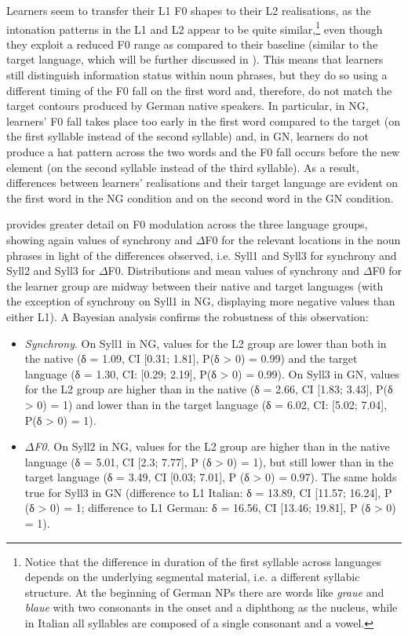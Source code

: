 Learners seem to transfer their L1 F0 shapes to their L2 realisations, as the intonation patterns in the L1 and L2 appear to be quite similar,\footnote{Notice that the difference in duration of the first syllable across languages depends on the underlying segmental material, i.e. a different syllabic structure. At the beginning of German NPs there are words like \textit{graue} and \textit{blaue} with two consonants in the onset and a diphthong as the nucleus, while in Italian all syllables are composed of a single consonant and a vowel.} even though they exploit a reduced F0 range as compared to their baseline (similar to the target language, which will be further discussed in ). This means that learners still distinguish information status within noun phrases, but they do so using a different timing of the F0 fall on the first word and, therefore, do not match the target contours produced by German native speakers. In particular, in NG, learners’ F0 fall takes place too early in the first word compared to the target (on the first syllable instead of the second syllable) and, in GN, learners do not produce a hat pattern across the two words and the F0 fall occurs before the new element (on the second syllable instead of the third syllable). As a result, differences between learners’ realisations and their target language are evident on the first word in the NG condition and on the second word in the GN condition.

 provides greater detail on F0 modulation across the three language groups, showing again values of synchrony and ${\Delta}$F0 for the relevant locations in the noun phrases in light of the differences observed, i.e. Syll1 and Syll3 for synchrony and Syll2 and Syll3 for ${\Delta}$F0. Distributions and mean values of synchrony and ${\Delta}$F0 for the learner group are midway between their native and target languages (with the exception of synchrony on Syll1 in NG, displaying more negative values than either L1). A Bayesian analysis confirms the robustness of this observation:


\begin{itemize}
\item \textit{Synchrony}. On Syll1 in NG, values for the L2 group are lower than both in the native (δ = 1.09, CI [0.31; 1.81], P(δ > 0) = 0.99) and the target language (δ = 1.30, CI: [0.29; 2.19], P(δ > 0) = 0.99). On Syll3 in GN, values for the L2 group are higher than in the native (δ = 2.66, CI [1.83; 3.43], P(δ > 0) = 1) and lower than in the target language (δ = 6.02, CI: [5.02; 7.04], P(δ > 0) = 1).
\item \textit{${\Delta}$F0}. On Syll2 in NG, values for the L2 group are higher than in the native language (δ = 5.01, CI [2.3; 7.77], P (δ > 0) = 1), but still lower than in the target language (δ = 3.49, CI [0.03; 7.01], P (δ > 0) = 0.97). The same holds true for Syll3 in GN (difference to L1 Italian: δ = 13.89, CI [11.57; 16.24], P (δ > 0) = 1; difference to L1 German: δ = 16.56, CI [13.46; 19.81], P (δ > 0) = 1).
\end{itemize}


